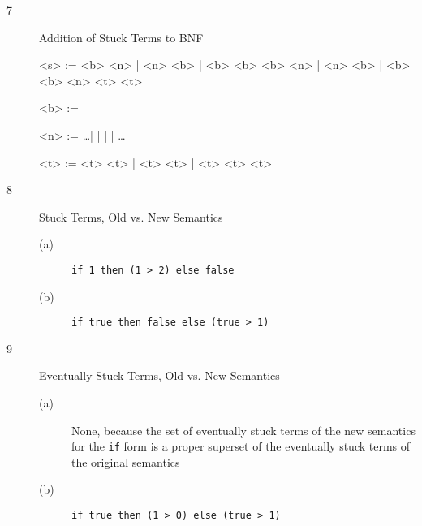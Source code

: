 \documentclass{article}
\begin{document}
\begin{description}
  \item[7]{Addition of Stuck Terms to BNF}

    \begin{grammar}
      <s> :=  <b>  \lit*{+} <n> | <n> \lit*{+} <b> | <b> \lit*{+} <b>
      \alt <b>  \lit*{>} <n> | <n> \lit*{>} <b> | <b> \lit*{>} <b>
      \alt {} <n>  <t>  <t>

      <b> :=  | 

      <n> := \ldots |  |  |  | \ldots

      <t> := <t> \lit*{+} <t> | <t> \lit*{>} <t> |  <t>  <t>  <t>
    \end{grammar}

  \item[8]{Stuck Terms, Old vs. New Semantics}
    \begin{description}
      \item[(a)] \verb|if 1 then (1 > 2) else false|
      \item[(b)] \verb|if true then false else (true > 1)|
    \end{description}

  \item[9]{Eventually Stuck Terms, Old vs. New Semantics}
    \begin{description}
      \item[(a)] None, because the set of eventually stuck terms of the new semantics for the \verb|if| form is a proper superset of the eventually stuck terms of the original semantics
      \item[(b)] \verb|if true then (1 > 0) else (true > 1)|
    \end{description}


\end{description}
\end{document}
